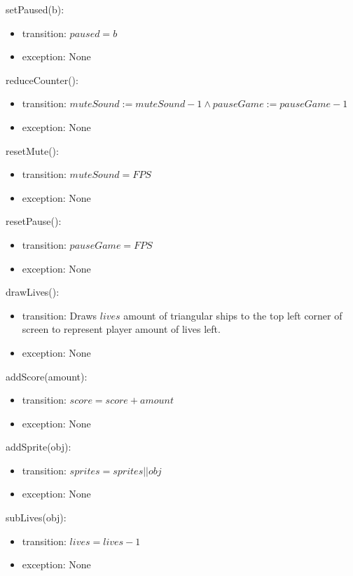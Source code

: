 \documentclass[12pt]{article}
\begin{document}
setPaused(b):
\begin{itemize}
    \item transition: $paused = b$
    \item exception: None
\end{itemize}

reduceCounter():
\begin{itemize}
    \item transition: $ muteSound := muteSound - 1 \land pauseGame := pauseGame - 1 $
    \item exception: None
\end{itemize}

resetMute():
\begin{itemize}
    \item transition: $ muteSound = FPS $
    \item exception: None
\end{itemize}

resetPause():
\begin{itemize}
    \item transition: $ pauseGame = FPS $
    \item exception: None
\end{itemize}

drawLives():
\begin{itemize}
    \item transition: Draws $lives$ amount of triangular ships to the top left corner of screen to represent player amount of lives left.
    \item exception: None
\end{itemize}

addScore(amount):
\begin{itemize}
    \item transition: $ score = score + amount $
    \item exception: None
\end{itemize}

addSprite(obj):
\begin{itemize}
    \item transition: $ sprites = sprites || obj $
    \item exception: None
\end{itemize}

subLives(obj):
\begin{itemize}
    \item transition: $ lives = lives - 1 $
    \item exception: None
\end{itemize}
\end{document}
